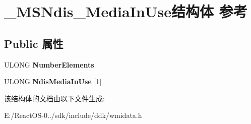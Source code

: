 \hypertarget{struct___m_s_ndis___media_in_use}{}\section{\+\_\+\+M\+S\+Ndis\+\_\+\+Media\+In\+Use结构体 参考}
\label{struct___m_s_ndis___media_in_use}
\subsection*{Public 属性}
\begin{DoxyCompactItemize}
\item 
\mbox{\label{struct___m_s_ndis___media_in_use_af8661fa78188c301c2166e474552b451}} 
U\+L\+O\+NG {\bfseries Number\+Elements}
\item 
\mbox{\label{struct___m_s_ndis___media_in_use_ad5cf63bba73c5639bd8ce06ef2918f89}} 
U\+L\+O\+NG {\bfseries Ndis\+Media\+In\+Use} \mbox{[}1\mbox{]}
\end{DoxyCompactItemize}


该结构体的文档由以下文件生成\+:\begin{DoxyCompactItemize}
\item 
E\+:/\+React\+O\+S-\/0../sdk/include/ddk/wmidata.\+h\end{DoxyCompactItemize}
